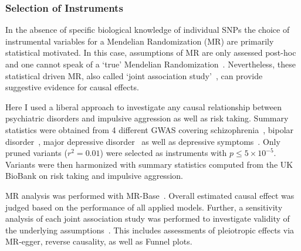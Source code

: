 \subsubsection{Selection of Instruments}
\label{ssub:Selection_of_Intstuments}

In the absence of specific biological knowledge of individual SNPs the choice of instrumental variables for a Mendelian Randomization (MR) are primarily statistical motivated.
In this case, assumptions of MR are only assessed post-hoc and one cannot speak of a `true' Mendelian Randomization~\cite{Burgess2016a}.
Nevertheless, these statistical driven MR, also called `joint association study'~\cite{Burgess2016a}, can provide suggestive evidence for causal effects.

Here I used a liberal approach to investigate any causal relationship between psychiatric disorders and impulsive aggression as well as risk taking.
Summary statistics were obtained from 4 different GWAS covering schizophrenia~\cite{Ripke2014}, bipolar disorder~\cite{PsychiatricGWASConsortiumBipolarDisorderWorkingGroup2011}, major depressive disorder~\cite{MajorDepressiveDisorderWorkingGroupofthePsychiatricGWASConsortium2013} as well as depressive symptoms~\cite{Okbay2016}.
Only pruned variants ($r^2=0.01$) were selected as instruments with $p\leq 5\times 10^{-5}$.
Variants were then harmonized with summary statistics computed from the UK BioBank on risk taking and impulsive aggression. 

MR analysis was performed with MR-Base~\cite{Hemani2016}.
Overall estimated causal effect was judged based on the performance of all applied models.
Further, a sensitivity analysis of each joint association study was performed to investigate validity of the underlying assumptions~\cite{Burgess2016}.  
This includes assessments of pleiotropic effects via MR-egger, reverse causality, as well as Funnel plots.
